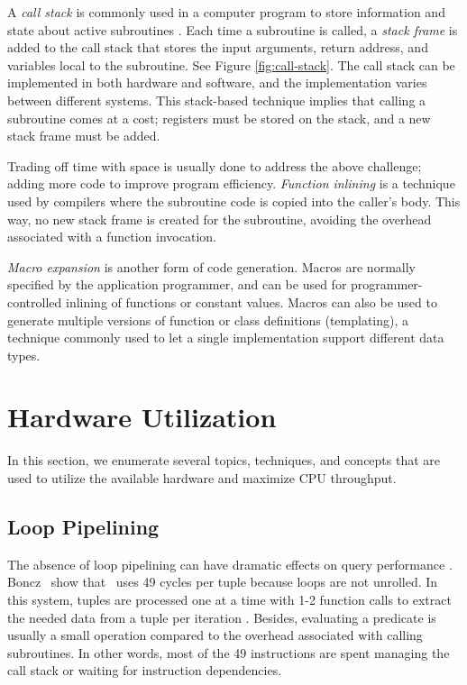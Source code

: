 A \textit{call stack} is commonly used in a computer program to store information and state about active subroutines \cite{Wikipedia_contributors2015-od}. Each time a subroutine is called, a \textit{stack frame} is added to the call stack that stores the input arguments, return address, and variables local to the subroutine. See Figure \ref{fig:call-stack}. The call stack can be implemented in both hardware and software, and the implementation varies between different systems. This stack-based technique implies that calling a subroutine comes at a cost; registers must be stored on the stack, and a new stack frame must be added.

Trading off time with space is usually done to address the above challenge; adding more code to improve program efficiency. \textit{Function inlining} is a technique used by compilers where the subroutine code is copied into the caller's body. This way, no new stack frame is created for the subroutine, avoiding the overhead associated with a function invocation.

\textit{Macro expansion} is another form of code generation. Macros are normally specified by the application programmer, and can be used for programmer-controlled inlining of functions or constant values. Macros can also be used to generate multiple versions of function or class definitions (templating), a technique commonly used to let a single implementation support different data types.

\section{Hardware Utilization}
\label{sec:Hardware Utilization}
In this section, we enumerate several topics, techniques, and concepts that are used to utilize the available hardware and maximize CPU throughput.

\subsection{Loop Pipelining}
\label{sub:Loop Pipelining}
The absence of loop pipelining can have dramatic effects on query performance \cite{Boncz2005-wj}. Boncz \ea~show that \mysql~uses 49 cycles per tuple because loops are not unrolled. In this system, tuples are processed one at a time with 1-2 function calls to extract the needed data from a tuple per iteration \cite{Abadi2008-dd}. Besides, evaluating a predicate is usually a small operation compared to the overhead associated with calling subroutines. In other words, most of the 49 instructions are spent managing the call stack or waiting for instruction dependencies.

